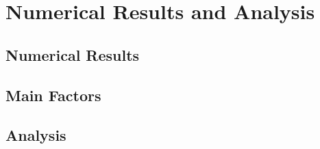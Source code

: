 \section{Numerical Results and Analysis} %
\label{sec:numerical_results}

\subsection{Numerical Results} %
\label{sub:effect_of_1}


\subsection{Main Factors} %
\label{sub:main_factors}


\subsection{Analysis} %
\label{sub:analysis}

